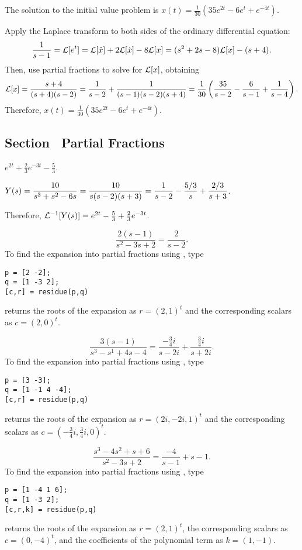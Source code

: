  \ans The solution to the initial value problem is
$x(t) = \frac{1}{30}(35e^{2t}-6e^t+e^{-4t})$.

\soln Apply the Laplace transform to both sides of the ordinary
differential equation:
\[
\frac{1}{s-1} = {\cal L}[e^t]
= {\cal L}[\ddot{x}] + 2{\cal L}[\dot{x}] - 8{\cal L}[x]
= (s^2 + 2s - 8){\cal L}[x] - (s + 4).
\]
Then, use partial fractions to solve for ${\cal L}[x]$, obtaining
\[
{\cal L}[x] = \frac{s+4}{(s + 4)(s - 2)}
= \frac{1}{s-2} + \frac{1}{(s-1)(s-2)(s+4)}
= \frac{1}{30}\left(\frac{35}{s-2} - \frac{6}{s-1} + \frac{1}{s-4}\right).
\]
Therefore, $x(t)=\frac{1}{30}(35e^{2t}-6e^t+e^{-4t})$.



\newpage
\subsection*{Section~\protect{\ref{S:PF}} Partial Fractions}

 \ans $e^{2t}+\frac{2}{3}e^{-3t}-\frac{5}{3}$.

\soln $Y(s)=\displaystyle\frac{10}{s^3+s^2-6s} = \frac{10}{s(s-2)(s+3)}=
\frac{1}{s-2}-\frac{5/3}{s}+\frac{2/3}{s+3}$.  

Therefore,
${\cal L}^{-1}[Y(s)] = e^{2t}-\frac{5}{3}+\frac{2}{3}e^{-3t}$.

 \ans
\[
\frac{2(s - 1)}{s^2 - 3s + 2} = \frac{2}{s - 2}.
\]
\soln To find the expansion into partial fractions using \Matlabp, type
\begin{verbatim}
p = [2 -2];
q = [1 -3 2];
[c,r] = residue(p,q)
\end{verbatim}
\Matlab returns the roots of the expansion as $r = (2,1)^t$ and
the corresponding scalars as $c = (2,0)^t$.

 \ans
\[
\frac{3(s - 1)}{s^3 - s^1 + 4s - 4} = \frac{-\frac{3}{4}i}{s - 2i}
+ \frac{\frac{3}{4}i}{s + 2i}.
\]
\soln To find the expansion into partial fractions using \Matlabp, type
\begin{verbatim}
p = [3 -3];
q = [1 -1 4 -4];
[c,r] = residue(p,q)
\end{verbatim}
\Matlab returns the roots of the expansion as $r = (2i,-2i,1)^t$ and
the corresponding scalars as $c = (-\frac{3}{4}i,\frac{3}{4}i,0)^t$.

\ans
\[
\frac{s^3 - 4s^2 + s + 6}{s^2 - 3s + 2}
= \frac{-4}{s - 1} + s - 1.
\]
\soln To find the expansion into partial fractions using \Matlabp, type
\begin{verbatim}
p = [1 -4 1 6];
q = [1 -3 2];
[c,r,k] = residue(p,q)
\end{verbatim}
\Matlab returns the roots of the expansion as $r = (2,1)^t$, the
corresponding scalars as $c = (0,-4)^t$, and the coefficients of the
polynomial term as $k = (1,-1)$.



